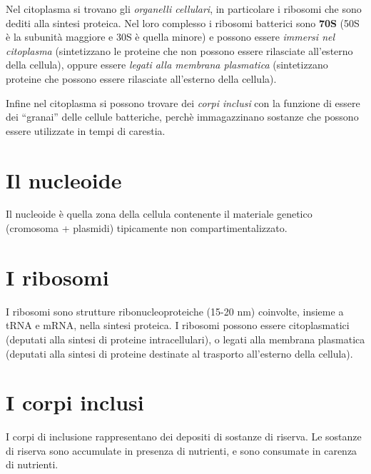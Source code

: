 \documentclass[11pt]{book}
\begin{document}
Nel citoplasma si trovano gli \emph{organelli cellulari}, in particolare i ribosomi che sono dediti alla sintesi proteica. Nel loro complesso i ribosomi batterici sono \textbf{70S} (50S è la subunità maggiore e 30S è quella minore) e possono essere \emph{immersi nel citoplasma} (sintetizzano le proteine che non possono essere rilasciate all'esterno della cellula), oppure essere \emph{legati alla membrana plasmatica} (sintetizzano proteine che possono essere rilasciate all'esterno della cellula).

Infine nel citoplasma si possono trovare dei \emph{corpi inclusi} con la funzione di essere dei ``granai'' delle cellule batteriche, perchè immagazzinano sostanze che possono essere utilizzate in tempi di carestia.

\section{Il nucleoide}
Il nucleoide è quella zona della cellula contenente il materiale genetico (cromosoma + plasmidi) tipicamente non compartimentalizzato. 

\section{I ribosomi}
I ribosomi sono strutture ribonucleoproteiche (15-20 nm) coinvolte, insieme a tRNA e mRNA, nella sintesi proteica. I ribosomi possono essere citoplasmatici (deputati alla sintesi di proteine intracellulari), o legati alla membrana plasmatica (deputati alla sintesi di proteine destinate al trasporto all’esterno della cellula).

\section{I corpi inclusi}
I corpi di inclusione rappresentano dei depositi di sostanze di riserva. Le sostanze di riserva sono accumulate in presenza di nutrienti, e sono consumate in carenza di nutrienti.
\end{document}
